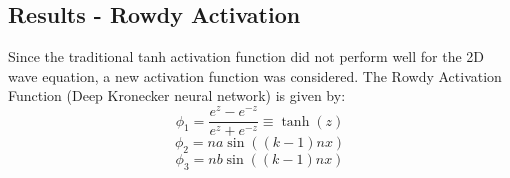 \documentclass[11pt]{article}
\begin{document}
\subsection{Results - Rowdy Activation}
Since the traditional tanh activation function did not perform well for the 2D wave equation, a new activation function was considered. The Rowdy Activation Function (Deep Kronecker neural network) is given by:
\begin{equation}
    \phi_1 = \frac{e^z-e^{-z}}{e^z+e^{-z}} \equiv \tanh(z)
\end{equation}
\begin{equation}
    \phi_2 = n a \sin((k-1)n x)
\end{equation}
\begin{equation}
    \phi_3 = n b \sin((k-1)n x)
\end{equation}
\end{document}
